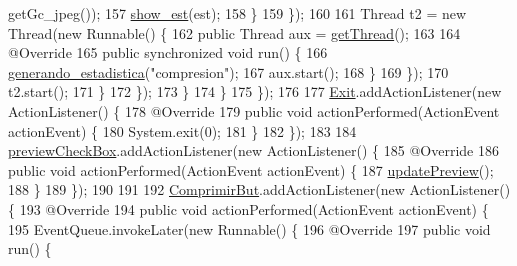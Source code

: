\begin{DoxyCode}
      getGc\_jpeg());
157                                     \hyperlink{classpresentacion_1_1form_1_1mainForm_a6eb9e9b4f7bb6da2c592a5a0294a6a06}{show\_est}(est);
158                                 \}
159                             \});
160 
161                             Thread t2 = \textcolor{keyword}{new} Thread(\textcolor{keyword}{new} Runnable() \{
162                                 \textcolor{keyword}{public} Thread aux = \hyperlink{classpresentacion_1_1form_1_1mainForm_ac6348f8bdef39bfa651f145c00664320}{getThread}();
163 
164                                 @Override
165                                 \textcolor{keyword}{public} \textcolor{keyword}{synchronized} \textcolor{keywordtype}{void} run() \{
166                                     \hyperlink{classpresentacion_1_1form_1_1mainForm_a34580a4b6e2c162d35ab5502f0ac7e4c}{generando\_estadistica}(\textcolor{stringliteral}{"compresion"});
167                                     aux.start();
168                                 \}
169                             \});
170                             t2.start();
171                         \}
172                     \});
173                 \}
174             \}
175         \});
176 
177         \hyperlink{classpresentacion_1_1form_1_1mainForm_a721fa95a4d72e8f68875fcc0003e041f}{Exit}.addActionListener(\textcolor{keyword}{new} ActionListener() \{
178             @Override
179             \textcolor{keyword}{public} \textcolor{keywordtype}{void} actionPerformed(ActionEvent actionEvent) \{
180                 System.exit(0);
181             \}
182         \});
183 
184         \hyperlink{classpresentacion_1_1form_1_1mainForm_a0dbe9873e69c0702a519d1cd171594c0}{previewCheckBox}.addActionListener(\textcolor{keyword}{new} ActionListener() \{
185             @Override
186             \textcolor{keyword}{public} \textcolor{keywordtype}{void} actionPerformed(ActionEvent actionEvent) \{
187                 \hyperlink{classpresentacion_1_1form_1_1mainForm_aa71c48a8ef6eb2b3913dd665e5439538}{updatePreview}();
188             \}
189         \});
190 
191 
192         \hyperlink{classpresentacion_1_1form_1_1mainForm_a8a68ad38dda26d35d37dccec4fa9338d}{ComprimirBut}.addActionListener(\textcolor{keyword}{new} ActionListener() \{
193             @Override
194             \textcolor{keyword}{public} \textcolor{keywordtype}{void} actionPerformed(ActionEvent actionEvent) \{
195                 EventQueue.invokeLater(\textcolor{keyword}{new} Runnable() \{
196                     @Override
197                     \textcolor{keyword}{public} \textcolor{keywordtype}{void} run() \{

\end{DoxyCode}
